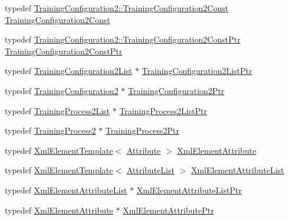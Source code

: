 \begin{DoxyCompactItemize}
\item 
typedef \hyperlink{class_k_k_m_l_l_1_1_training_configuration2_a4d33ba048f73ef16a421b40e39ddc80b}{Training\+Configuration2\+::\+Training\+Configuration2\+Const} \hyperlink{namespace_k_k_m_l_l_abec6237fd9c0112ff72b75b10d4b5696}{Training\+Configuration2\+Const}
\item 
typedef \hyperlink{class_k_k_m_l_l_1_1_training_configuration2_ac571c80e182ec908dabdfd3097142b89}{Training\+Configuration2\+::\+Training\+Configuration2\+Const\+Ptr} \hyperlink{namespace_k_k_m_l_l_a7f2af9b6e9a0f9d0ac33c66c0856de35}{Training\+Configuration2\+Const\+Ptr}
\item 
typedef \hyperlink{class_k_k_m_l_l_1_1_training_configuration2_list}{Training\+Configuration2\+List} $\ast$ \hyperlink{namespace_k_k_m_l_l_a77bfbdd70b510fed053cec865434ba28}{Training\+Configuration2\+List\+Ptr}
\item 
typedef \hyperlink{class_k_k_m_l_l_1_1_training_configuration2}{Training\+Configuration2} $\ast$ \hyperlink{namespace_k_k_m_l_l_a5da4b334417f8c9e4e2fd5924da7fe62}{Training\+Configuration2\+Ptr}
\item 
typedef \hyperlink{class_k_k_m_l_l_1_1_training_process2_list}{Training\+Process2\+List} $\ast$ \hyperlink{namespace_k_k_m_l_l_a139987ae75e5ba08c76635f8170f858f}{Training\+Process2\+List\+Ptr}
\item 
typedef \hyperlink{class_k_k_m_l_l_1_1_training_process2}{Training\+Process2} $\ast$ \hyperlink{namespace_k_k_m_l_l_a1fd087a9fde5db46fe14f6e98f994a71}{Training\+Process2\+Ptr}
\item 
typedef \hyperlink{class_k_k_b_1_1_xml_element_template}{Xml\+Element\+Template}$<$ \hyperlink{class_k_k_m_l_l_1_1_attribute}{Attribute} $>$ \hyperlink{namespace_k_k_m_l_l_aed7d3fc29995cb426aaf9f5623100008}{Xml\+Element\+Attribute}
\item 
typedef \hyperlink{class_k_k_b_1_1_xml_element_template}{Xml\+Element\+Template}$<$ \hyperlink{class_k_k_m_l_l_1_1_attribute_list}{Attribute\+List} $>$ \hyperlink{namespace_k_k_m_l_l_a63e2fcc786ad01bb56595ed647d0447f}{Xml\+Element\+Attribute\+List}
\item 
typedef \hyperlink{namespace_k_k_m_l_l_a63e2fcc786ad01bb56595ed647d0447f}{Xml\+Element\+Attribute\+List} $\ast$ \hyperlink{namespace_k_k_m_l_l_abd419c888840e95517fce2c299041d18}{Xml\+Element\+Attribute\+List\+Ptr}
\item 
typedef \hyperlink{namespace_k_k_m_l_l_aed7d3fc29995cb426aaf9f5623100008}{Xml\+Element\+Attribute} $\ast$ \hyperlink{namespace_k_k_m_l_l_ab7e5f3293606472391b48926f69ca5ab}{Xml\+Element\+Attribute\+Ptr}

\end{DoxyCompactItemize}
